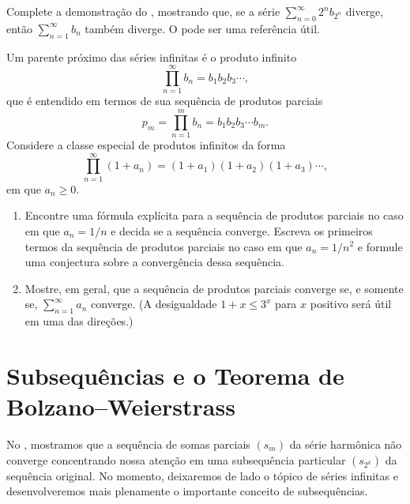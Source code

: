 \begin{exercise}\label{ex:2-4-9}
Complete a demonstração do , mostrando que, se a série $\sum_{n=0}^{\infty}2^n b_{2^n}$ diverge, então $\sum_{n=1}^{\infty}b_n$ também diverge. O  pode ser uma referência útil.
\end{exercise}

\begin{exercise}\label{ex:2-4-10}
Um parente próximo das séries infinitas é o produto infinito
\[
\prod_{n=1}^{\infty}b_n=b_1b_2b_3\cdots,
\]
que é entendido em termos de sua sequência de produtos parciais 
\[
p_m=\prod_{n=1}^{m}b_n=b_1b_2b_3\cdots b_m.
\]
Considere a classe especial de produtos infinitos da forma
\[
\prod_{n=1}^{\infty}(1+a_n)=(1+a_1)(1+a_2)(1+a_3)\cdots,
\]
em que $a_n\geq0$.
\begin{enumerate}[label=\alph*)]
\item Encontre uma fórmula explícita para a sequência de produtos parciais no caso em que $a_n=1/n$ e decida se a sequência converge. Escreva os primeiros termos da sequência de produtos parciais no caso em que $a_n=1/n^2$ e formule uma conjectura sobre a convergência dessa sequência.
\item Mostre, em geral, que a sequência de produtos parciais converge se, e somente se, $\sum_{n=1}^{\infty}a_n$ converge. (A desigualdade $1+x\leq3^x$ para $x$ positivo será útil em uma das direções.)
\end{enumerate}
\end{exercise}


\section{Subsequências e o Teorema de Bolzano--Weierstrass}\label{sec2:subsequencias-bolzano-weierstrass}

No , mostramos que a sequência de somas parciais $(s_m)$ da série harmônica não converge concentrando nossa atenção em uma subsequência particular $(s_{2^k})$ da sequência original. No momento, deixaremos de lado o tópico de séries infinitas e desenvolveremos mais plenamente o importante conceito de subsequências.

